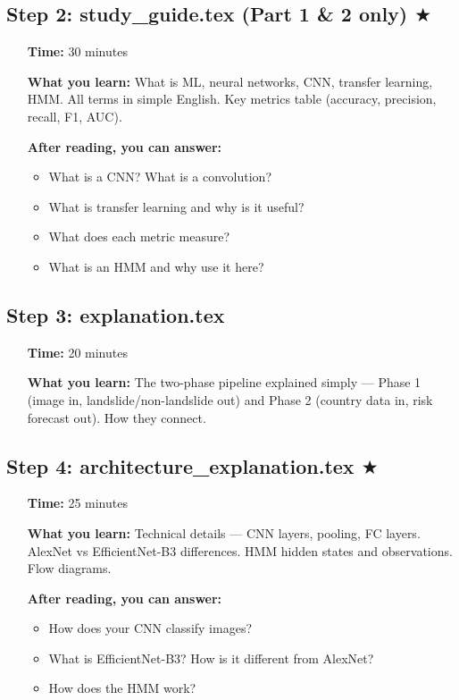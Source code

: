 \documentclass[12pt,a4paper]{article}
\begin{document}
\subsection*{Step 2: study\_guide.tex (Part 1 \& 2 only) $\bigstar$}
\begin{itemize}[leftmargin=1.5cm]
    \item[\textbf{Time:}] 30 minutes
    \item[\textbf{What you learn:}] What is ML, neural networks, CNN, transfer learning, HMM. All terms in simple English. Key metrics table (accuracy, precision, recall, F1, AUC).
    \item[\textbf{After reading, you can answer:}]
    \begin{itemize}
        \item What is a CNN? What is a convolution?
        \item What is transfer learning and why is it useful?
        \item What does each metric measure?
        \item What is an HMM and why use it here?
    \end{itemize}
\end{itemize}

\subsection*{Step 3: explanation.tex}
\begin{itemize}[leftmargin=1.5cm]
    \item[\textbf{Time:}] 20 minutes
    \item[\textbf{What you learn:}] The two-phase pipeline explained simply --- Phase 1 (image in, landslide/non-landslide out) and Phase 2 (country data in, risk forecast out). How they connect.
\end{itemize}

\subsection*{Step 4: architecture\_explanation.tex $\bigstar$}
\begin{itemize}[leftmargin=1.5cm]
    \item[\textbf{Time:}] 25 minutes
    \item[\textbf{What you learn:}] Technical details --- CNN layers, pooling, FC layers. AlexNet vs EfficientNet-B3 differences. HMM hidden states and observations. Flow diagrams.
    \item[\textbf{After reading, you can answer:}]
    \begin{itemize}
        \item How does your CNN classify images?
        \item What is EfficientNet-B3? How is it different from AlexNet?
        \item How does the HMM work?
    \end{itemize}
\end{itemize}
\end{document}
